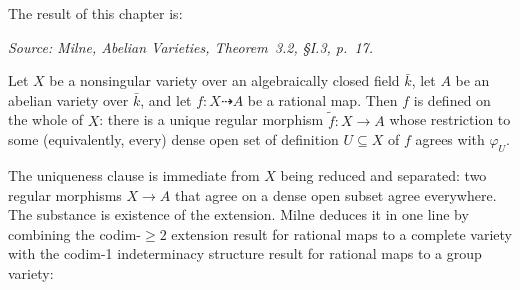 The result of this chapter is:

\begin{theorem}

  \label{thm:rational_map_to_av_extends}

  \textit{Source: Milne, \emph{Abelian Varieties}, Theorem~3.2, \S I.3, p.~17.}

  Let \(X\) be a nonsingular variety over an algebraically closed field \(\bar k\), let \(A\) be
  an abelian variety over \(\bar k\), and let \(f \colon X \dashrightarrow A\) be a rational
  map. Then \(f\) is defined on the whole of \(X\): there is a unique regular morphism
  \(\widetilde f \colon X \to A\) whose restriction to some (equivalently, every) dense open
  set of definition \(U \subseteq X\) of \(f\) agrees with \(\varphi_U\).
\end{theorem}

The uniqueness clause is immediate from \(X\) being reduced and separated: two regular
morphisms \(X \to A\) that agree on a dense open subset agree everywhere. The substance is
existence of the extension. Milne deduces it in one line by combining the codim-\(\geq 2\)
extension result for rational maps to a complete variety with the codim-1 indeterminacy
structure result for rational maps to a group variety:

